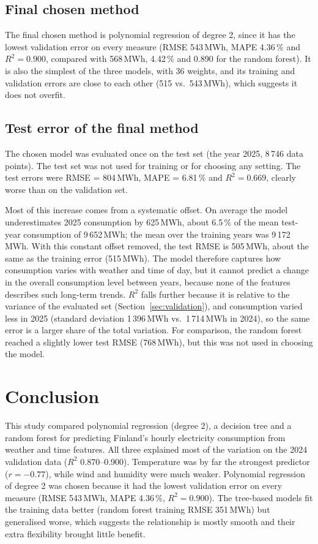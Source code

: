 \documentclass[10pt,a4paper]{article}
\begin{document}
\subsection{Final chosen method}

The final chosen method is polynomial regression of degree 2, since it has the lowest
validation error on every measure (RMSE 543\,MWh, MAPE 4.36\,\% and $R^2 = 0.900$, compared
with 568\,MWh, 4.42\,\% and 0.890 for the random forest). It is also the simplest of the
three models, with 36 weights, and its training and validation errors are close to each
other (515 vs.\ 543\,MWh), which suggests it does not overfit.

\subsection{Test error of the final method}

The chosen model was evaluated once on the test set (the year 2025, 8\,746 data points). The
test set was not used for training or for choosing any setting. The test errors were
RMSE = 804\,MWh, MAPE = 6.81\,\% and $R^2 = 0.669$, clearly worse than on the validation set.

Most of this increase comes from a systematic offset. On average the model underestimates
2025 consumption by 625\,MWh, about 6.5\,\% of the mean test-year consumption of
9\,652\,MWh; the mean over the training years was 9\,172\,MWh. With this constant offset
removed, the test RMSE is 505\,MWh, about the same as the training error (515\,MWh). The
model therefore captures how consumption varies with weather and time of day, but it cannot
predict a change in the overall consumption level between years, because none of the
features describes such long-term trends. $R^2$ falls further because it is relative to the
variance of the evaluated set (Section~\ref{sec:validation}), and consumption varied less in
2025 (standard deviation 1\,396\,MWh vs.\ 1\,714\,MWh in 2024), so the same error is a larger
share of the total variation. For comparison, the random forest reached a slightly lower test
RMSE (768\,MWh), but this was not used in choosing the model.

\section{Conclusion}
\label{sec:conclusion}

This study compared polynomial regression (degree 2), a decision tree and a random forest for
predicting Finland's hourly electricity consumption from weather and time features. All three
explained most of the variation on the 2024 validation data ($R^2$ 0.870--0.900).
Temperature was by far the strongest predictor ($r = -0.77$), while wind and humidity were
much weaker. Polynomial regression of degree 2 was chosen because it had the lowest
validation error on every measure (RMSE 543\,MWh, MAPE 4.36\,\%, $R^2 = 0.900$). The
tree-based models fit the training data better (random forest training RMSE 351\,MWh) but
generalised worse, which suggests the relationship is mostly smooth and their extra
flexibility brought little benefit.
\end{document}
